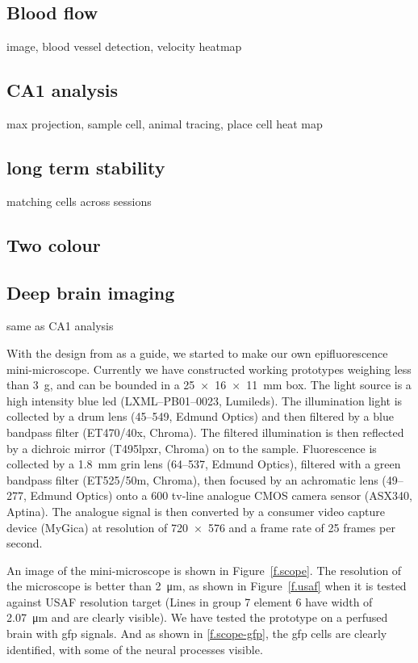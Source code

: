 \subsection{Blood flow}
image, blood vessel detection, velocity heatmap

\subsection{CA1 analysis}
max projection, sample cell, animal tracing, place cell heat map

\subsection{long term stability}
matching cells across sessions

\subsection{Two colour}

\subsection{Deep brain imaging}
same as CA1 analysis


With the design from \citet{ghosh11} as a guide, we started to make our own epifluorescence mini-microscope. Currently we have constructed working prototypes weighing less than \SI{3}{\g}, and can be bounded in a \SI{25 x 16 x 11}{\mm} box. The light source is a high intensity blue \gls{led} (LXML--PB01--0023, Lumileds). The illumination light is collected by a drum lens (45--549, Edmund Optics) and then filtered by a blue bandpass filter (ET470/40x, Chroma). The filtered illumination is then reflected by a dichroic mirror (T495lpxr, Chroma) on to the sample. Fluorescence is collected by a \SI{1.8}{\mm} \gls{grin} lens (64--537, Edmund Optics), filtered with a green bandpass filter (ET525/50m, Chroma), then focused by an achromatic lens (49--277, Edmund Optics) onto a 600 tv-line analogue CMOS camera sensor (ASX340, Aptina). The analogue signal is then converted by a consumer video capture device (MyGica) at resolution of \num{720 x 576} and a frame rate of 25 frames per second.

An image of the mini-microscope is shown in Figure~\ref{f.scope}. The resolution of the microscope is better than \SI{2}{\um}, as shown in Figure~\ref{f.usaf} when it is tested against USAF resolution target (Lines in group 7 element 6 have width of \SI{2.07}{\um} and are clearly visible). We have tested the prototype on a perfused brain with \gls{gfp} signals. And as shown in \ref{f.scope-gfp}, the \gls{gfp} cells are clearly identified, with some of the neural processes visible.

